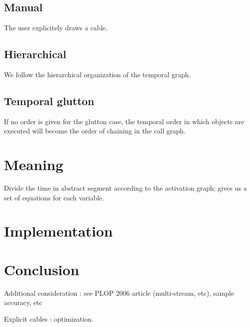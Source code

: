 \documentclass[a4paper,twocolumns]{article}
\begin{document}
    \subsection{Manual}
    The user explicitely draws a cable.
    
    \subsection{Hierarchical}
    We follow the hierarchical organization of the temporal graph.
    
    
    \subsection{Temporal glutton}
    If no order is given for the glutton case, the temporal order in which objects are executed
    will become the order of chaining in the call graph.
    
	\section{Meaning}
	Divide the time in abstract segment according to the activation graph; gives us a set of equations for each variable.
	\section{Implementation}
    \section{Conclusion}
    Additional consideration : see PLOP 2006 article (multi-stream, etc), sample accuracy, etc
    
    Explicit cables : optimization.
\end{document}
